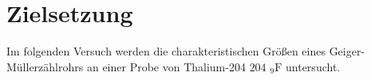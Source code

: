 \section{Zielsetzung}

Im folgenden Versuch werden die charakteristischen Größen eines Geiger-Müllerzählrohrs an einer Probe von Thalium-204 ${204}_{\phantom{1}9}\mathrm{F}$ untersucht.